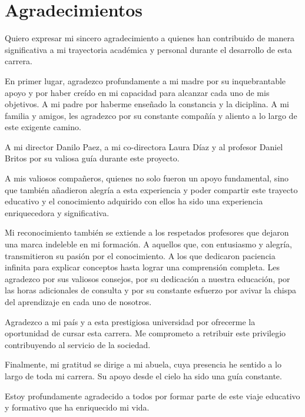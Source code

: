 \chapter*{Agradecimientos}
Quiero expresar mi sincero agradecimiento a quienes han contribuido de manera significativa a mi trayectoria académica y personal durante el desarrollo de esta carrera.

En primer lugar, agradezco profundamente a mi madre por su inquebrantable apoyo y por haber creído en mi capacidad para alcanzar cada uno de mis objetivos. A mi padre por haberme enseñado la constancia y la diciplina. A mi familia y amigos, les agradezco por su constante compañía y aliento a lo largo de este exigente camino.

A mi director Danilo Paez, a mi co-directora Laura Díaz y al profesor Daniel Britos por su valiosa guía durante este proyecto.

A mis valiosos compañeros, quienes no solo fueron un apoyo fundamental, sino que también añadieron alegría a esta experiencia y poder compartir este trayecto educativo y el conocimiento adquirido con ellos ha sido una experiencia enriquecedora y significativa. 

Mi reconocimiento también se extiende a los respetados profesores que dejaron una marca indeleble en mi formación. A aquellos que, con entusiasmo y alegría, transmitieron su pasión por el conocimiento. A los que dedicaron paciencia infinita para explicar conceptos hasta lograr una comprensión completa. Les agradezco por sus valiosos consejos, por su dedicación a nuestra educación, por las horas adicionales de consulta y por su constante esfuerzo por avivar la chispa del aprendizaje en cada uno de nosotros.

Agradezco a mi país y a esta prestigiosa universidad por ofrecerme la oportunidad de cursar esta carrera. Me comprometo a retribuir este privilegio contribuyendo al servicio de la sociedad.

Finalmente, mi gratitud se dirige a mi abuela, cuya presencia he sentido a lo largo de toda mi carrera. Su apoyo desde el cielo ha sido una guía constante.

Estoy profundamente agradecido a todos por formar parte de este viaje educativo y formativo que ha enriquecido mi vida.
